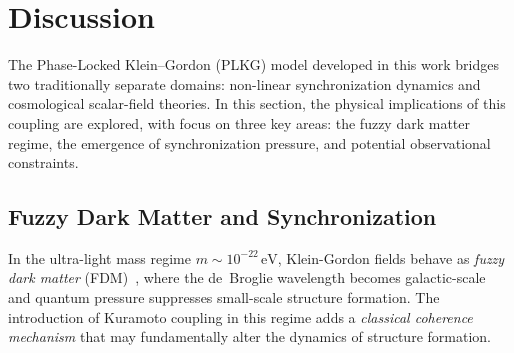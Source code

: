 
\section{Discussion}
\label{sec:discussion}

The Phase-Locked Klein--Gordon (PLKG) model developed in this work bridges two traditionally separate domains: non-linear synchronization dynamics and cosmological scalar-field theories. In this section, the physical implications of this coupling are explored, with focus on three key areas: the fuzzy dark matter regime, the emergence of synchronization pressure, and potential observational constraints.

\subsection{Fuzzy Dark Matter and Synchronization}
\label{subsec:fdm_sync}

In the ultra-light mass regime $m \sim 10^{-22}\,\text{eV}$, Klein-Gordon fields behave as \emph{fuzzy dark matter} (FDM)~\cite{Hu2000,Marsh2016}, where the de~Broglie wavelength becomes galactic-scale and quantum pressure suppresses small-scale structure formation. The introduction of Kuramoto coupling in this regime adds a \emph{classical coherence mechanism} that may fundamentally alter the dynamics of structure formation.

